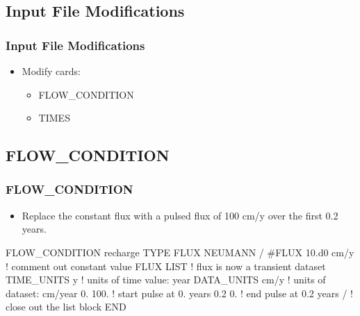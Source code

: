 \documentclass{beamer}
\newcommand\redcomment[1]{{{\color{red} #1}}}
\newcommand\bluecomment[1]{{{\color{blue} #1}}}
\newcommand\magentacomment[1]{{{\color{magenta} #1}}}
\begin{document}
\subsection{Input File Modifications}

\begin{frame}[fragile]\frametitle{Input File Modifications}

\begin{itemize}
\item Modify cards:
  \begin{itemize}
    \item FLOW\_CONDITION
    \item TIMES
   \end{itemize}
\end{itemize}

\end{frame}

\subsection{FLOW\_CONDITION}

\begin{frame}[fragile]\frametitle{FLOW\_CONDITION}

\begin{itemize}
\item Replace the constant flux with a pulsed flux of 100 cm/y over the first 0.2 years.
\end{itemize}


\begin{semiverbatim}

FLOW_CONDITION recharge
  TYPE
    FLUX NEUMANN
  /
  \magentacomment{#}FLUX 10.d0 cm/y   \bluecomment{! comment out constant value}
  \magentacomment{FLUX LIST          \bluecomment{! flux is now a transient dataset}
    TIME_UNITS y     \bluecomment{! units of time value: \redcomment{year}}
    DATA_UNITS cm/y  \bluecomment{! units of dataset: \redcomment{cm/year}}
    0. 100.          \bluecomment{! start pulse at 0. years}
    0.2 0.           \bluecomment{! end pulse at 0.2 years}
  /}                  \bluecomment{! close out the list block}
END

\end{semiverbatim}

\end{frame}

\end{document}
